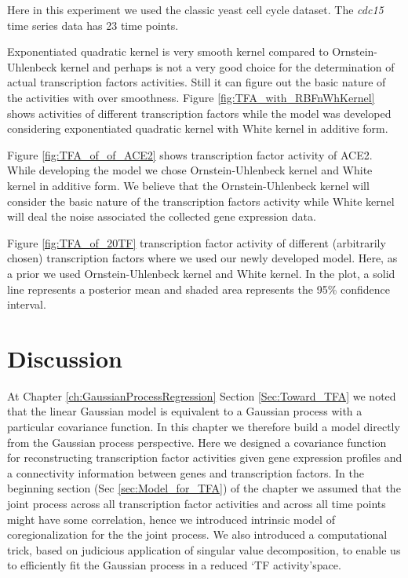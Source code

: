Here in this experiment we used the classic \cite{Spellman:1998} yeast cell cycle dataset. The \emph{cdc15} time series data has 23 time points. 

Exponentiated quadratic kernel is very smooth kernel compared to Ornstein-Uhlenbeck kernel and perhaps is not a very good choice for the determination of actual transcription factors activities. Still it can figure out the basic nature of the activities with over smoothness. Figure \ref{fig:TFA_with_RBFnWhKernel} shows activities of different transcription factors while the model was developed considering exponentiated quadratic kernel with White kernel in additive form.

Figure \ref{fig:TFA_of_of_ACE2} shows transcription factor activity of ACE2. While developing the model we chose Ornstein-Uhlenbeck kernel and White kernel in additive form. We believe that the Ornstein-Uhlenbeck kernel will consider the basic nature of the transcription factors activity while White kernel will deal the noise associated the collected gene expression data.

Figure \ref{fig:TFA_of_20TF} transcription factor activity of different (arbitrarily chosen) transcription factors  where we used our newly developed model. Here, as a prior we used Ornstein-Uhlenbeck kernel and White kernel. In the plot, a solid line represents a posterior mean and shaded area represents the 95\% confidence interval.

\section{Discussion}
At Chapter \ref{ch:GaussianProcessRegression} Section \ref{Sec:Toward_TFA} we noted that the linear Gaussian model is equivalent to a Gaussian process with a particular covariance function. In this chapter we therefore build a model directly from the Gaussian process perspective. Here we designed a covariance function for reconstructing transcription factor activities given gene expression profiles and a connectivity information between genes and transcription factors. In the beginning section (Sec \ref{sec:Model_for_TFA}) of the chapter we assumed that the joint process across all transcription factor activities and across all time points might have some correlation, hence we introduced intrinsic model of coregionalization for the the joint process. We also introduced a computational trick, based on  judicious application of singular value decomposition, to enable us to efficiently fit the Gaussian process in a reduced \lq TF activity\rq  space. 
